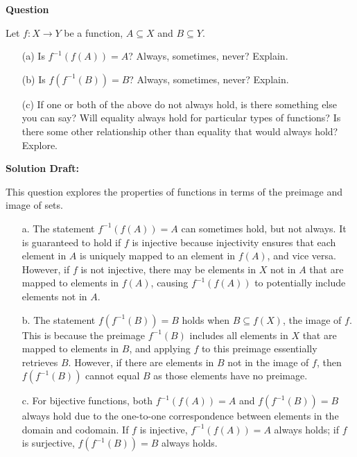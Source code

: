 \documentclass{article}
\begin{document}
\vspace{0.5cm} %

\noindent\textbf{Question}

Let \( f : X \to Y \) be a function, \( A \subseteq X \) and \( B \subseteq Y \).

\begin{enumerate}
    \item[(a)] Is \( f^{-1}(f(A)) = A \)? Always, sometimes, never? Explain.
    \item[(b)] Is \( f(f^{-1}(B)) = B \)? Always, sometimes, never? Explain.
    \item[(c)] If one or both of the above do not always hold, is there something else you can say? Will equality always hold for particular types of functions? Is there some other relationship other than equality that would always hold? Explore.
\end{enumerate}


\noindent\textbf{Solution Draft:} 

This question explores the properties of functions in terms of the preimage and image of sets.

\begin{enumerate}
    \item[a.]
The statement \( f^{-1}(f(A)) = A \) can sometimes hold, but not always. It is guaranteed to hold if \( f \) is injective because injectivity ensures that each element in \( A \) is uniquely mapped to an element in \( f(A) \), and vice versa. However, if \( f \) is not injective, there may be elements in \( X \) not in \( A \) that are mapped to elements in \( f(A) \), causing \( f^{-1}(f(A)) \) to potentially include elements not in \( A \).

\item[b.]
The statement \( f(f^{-1}(B)) = B \) holds when \( B \subseteq f(X) \), the image of \( f \). This is because the preimage \( f^{-1}(B) \) includes all elements in \( X \) that are mapped to elements in \( B \), and applying \( f \) to this preimage essentially retrieves \( B \). However, if there are elements in \( B \) not in the image of \( f \), then \( f(f^{-1}(B)) \) cannot equal \( B \) as those elements have no preimage.

\item[c.]
For bijective functions, both \( f^{-1}(f(A)) = A \) and \( f(f^{-1}(B)) = B \) always hold due to the one-to-one correspondence between elements in the domain and codomain. If \( f \) is injective, \( f^{-1}(f(A)) = A \) always holds; if \( f \) is surjective, \( f(f^{-1}(B)) = B \) always holds.
\end{enumerate}
\end{document}
